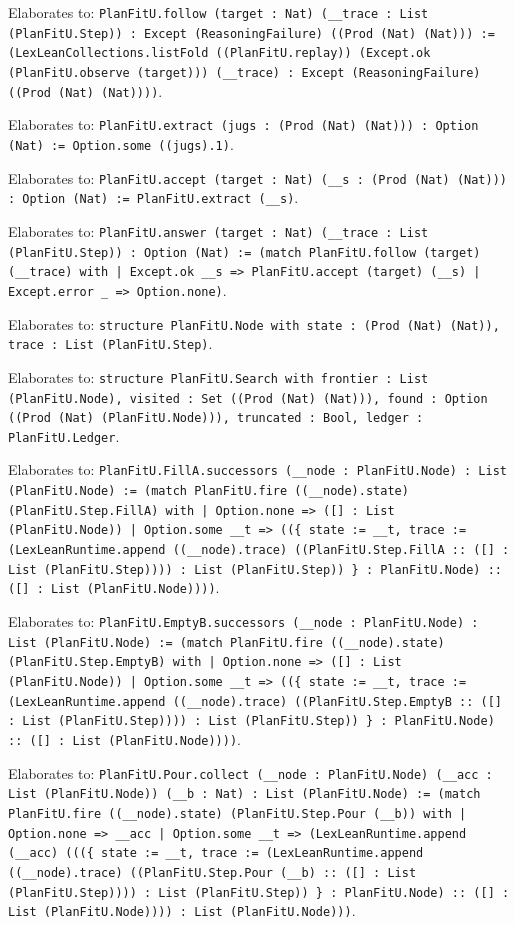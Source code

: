\documentclass[11pt]{article}
\begin{document}
\noindent Elaborates to: \texttt{PlanFitU.follow (target : Nat) (\_\_trace : List (PlanFitU.Step)) : Except (ReasoningFailure) ((Prod (Nat) (Nat))) := (LexLeanCollections.listFold ((PlanFitU.replay)) (Except.ok (PlanFitU.observe (target))) (\_\_trace) : Except (ReasoningFailure) ((Prod (Nat) (Nat))))}.\par
\noindent Elaborates to: \texttt{PlanFitU.extract (jugs : (Prod (Nat) (Nat))) : Option (Nat) := Option.some ((jugs).1)}.\par
\noindent Elaborates to: \texttt{PlanFitU.accept (target : Nat) (\_\_s : (Prod (Nat) (Nat))) : Option (Nat) := PlanFitU.extract (\_\_s)}.\par
\noindent Elaborates to: \texttt{PlanFitU.answer (target : Nat) (\_\_trace : List (PlanFitU.Step)) : Option (Nat) := (match PlanFitU.follow (target) (\_\_trace) with | Except.ok \_\_s => PlanFitU.accept (target) (\_\_s) | Except.error \_ => Option.none)}.\par
\noindent Elaborates to: \texttt{structure PlanFitU.Node with state : (Prod (Nat) (Nat)), trace : List (PlanFitU.Step)}.\par
\noindent Elaborates to: \texttt{structure PlanFitU.Search with frontier : List (PlanFitU.Node), visited : Set ((Prod (Nat) (Nat))), found : Option ((Prod (Nat) (PlanFitU.Node))), truncated : Bool, ledger : PlanFitU.Ledger}.\par
\noindent Elaborates to: \texttt{PlanFitU.FillA.successors (\_\_node : PlanFitU.Node) : List (PlanFitU.Node) := (match PlanFitU.fire ((\_\_node).state) (PlanFitU.Step.FillA) with | Option.none => ([] : List (PlanFitU.Node)) | Option.some \_\_t => ((\{ state := \_\_t, trace := (LexLeanRuntime.append ((\_\_node).trace) ((PlanFitU.Step.FillA :: ([] : List (PlanFitU.Step)))) : List (PlanFitU.Step)) \} : PlanFitU.Node) :: ([] : List (PlanFitU.Node))))}.\par
\noindent Elaborates to: \texttt{PlanFitU.EmptyB.successors (\_\_node : PlanFitU.Node) : List (PlanFitU.Node) := (match PlanFitU.fire ((\_\_node).state) (PlanFitU.Step.EmptyB) with | Option.none => ([] : List (PlanFitU.Node)) | Option.some \_\_t => ((\{ state := \_\_t, trace := (LexLeanRuntime.append ((\_\_node).trace) ((PlanFitU.Step.EmptyB :: ([] : List (PlanFitU.Step)))) : List (PlanFitU.Step)) \} : PlanFitU.Node) :: ([] : List (PlanFitU.Node))))}.\par
\noindent Elaborates to: \texttt{PlanFitU.Pour.collect (\_\_node : PlanFitU.Node) (\_\_acc : List (PlanFitU.Node)) (\_\_b : Nat) : List (PlanFitU.Node) := (match PlanFitU.fire ((\_\_node).state) (PlanFitU.Step.Pour (\_\_b)) with | Option.none => \_\_acc | Option.some \_\_t => (LexLeanRuntime.append (\_\_acc) (((\{ state := \_\_t, trace := (LexLeanRuntime.append ((\_\_node).trace) ((PlanFitU.Step.Pour (\_\_b) :: ([] : List (PlanFitU.Step)))) : List (PlanFitU.Step)) \} : PlanFitU.Node) :: ([] : List (PlanFitU.Node)))) : List (PlanFitU.Node)))}.\par
\end{document}
